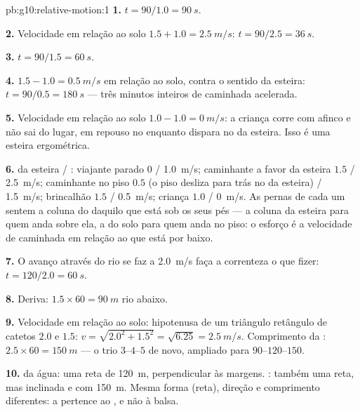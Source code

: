 \begin{solution}{pb:g10:relative-motion:1}
\textbf{1.} $t = 90/1.0 = \qty{90}{s}$.

\textbf{2.} Velocidade em relação ao solo $1.5 + 1.0 = \qty{2.5}{m/s}$:
$t = 90/2.5 = \qty{36}{s}$.

\textbf{3.} $t = 90/1.5 = \qty{60}{s}$.

\textbf{4.} $1.5 - 1.0 = \qty{0.5}{m/s}$ em relação ao solo, contra o
sentido da esteira: $t = 90/0.5 = \qty{180}{s}$ --- três minutos
inteiros de caminhada acelerada.

\textbf{5.} Velocidade em relação ao solo $1.0 - 1.0 = \qty{0}{m/s}$: a
criança corre com afinco e não sai do lugar, em repouso no  enquanto dispara no  da esteira. Isso é uma esteira
ergométrica.

\textbf{6.}  da esteira / : viajante parado
$0$ / \qty{1.0}{m/s}; caminhante a favor da esteira $1.5$ /
\qty{2.5}{m/s}; caminhante no piso $0.5$ (o piso desliza para trás no
 da esteira) / \qty{1.5}{m/s}; brincalhão $1.5$ /
\qty{0.5}{m/s}; criança $1.0$ / \qty{0}{m/s}. As pernas de cada um sentem
a coluna do  daquilo que está sob os seus pés --- a coluna da
esteira para quem anda sobre ela, a do solo para quem anda no piso: o
esforço é a velocidade de caminhada em relação ao que está por baixo.

\textbf{7.} O avanço através do rio se faz a \qty{2.0}{m/s} faça a
correnteza o que fizer: $t = 120/2.0 = \qty{60}{s}$.

\textbf{8.} Deriva: $1.5 \times 60 = \qty{90}{m}$ rio abaixo.

\textbf{9.} Velocidade em relação ao solo: hipotenusa de um triângulo
retângulo de catetos $2.0$ e $1.5$: $v = \sqrt{2.0^2 + 1.5^2}
= \sqrt{6.25} = \qty{2.5}{m/s}$. Comprimento da :
$2.5 \times 60 = \qty{150}{m}$ --- o trio $3$--$4$--$5$ de novo,
ampliado para $90$--$120$--$150$.

\textbf{10.}  da água: uma reta de \qty{120}{m},
perpendicular às margens. : também uma reta, mas
inclinada e com \qty{150}{m}. Mesma forma (reta), direção e comprimento
diferentes: a  pertence ao , e não à balsa.


\end{solution}
